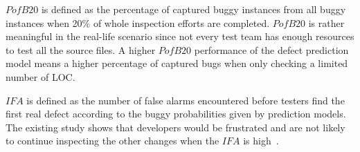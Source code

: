 \documentclass[journal]{IEEEtran}
\begin{document}
$PofB20$ is defined as the percentage of captured buggy instances from all buggy instances when 20\% of whole inspection efforts are completed. $PofB20$ is rather meaningful in the real-life scenario since not every test team has enough resources to test all the source files. A higher $PofB20$ performance of the defect prediction model means a higher percentage of captured bugs when only checking a limited number of LOC.


$IFA$ is defined as the number of false alarms encountered before testers find the first real defect according to the buggy probabilities given by prediction models. The existing study shows that developers would be frustrated and are not likely to continue inspecting the other changes when the $IFA$ is high~\cite{wang2018deep,zhou2018far,kochhar2016practitioners}.
\end{document}
